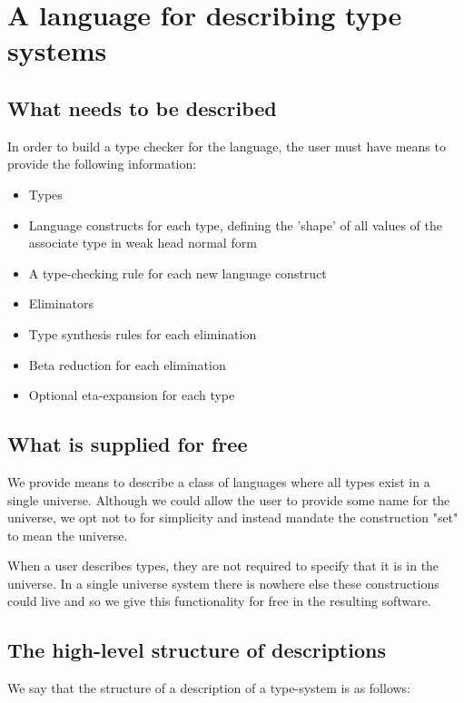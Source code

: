 \chapter{A language for describing type systems}
\label{chapter-DSL}


\section{What needs to be described}

In order to build a type checker for the language, the user must have
means to provide the following information:

\begin{itemize}
  \item Types
  \item Language constructs for each type, defining the 'shape' of
    all values of the associate type in weak head normal form
  \item A type-checking rule for each new language construct
  \item Eliminators
  \item Type synthesis rules for each elimination
  \item Beta reduction for each elimination
  \item Optional eta-expansion for each type
\end{itemize}

\section{What is supplied for free}

We provide means to describe a class of languages where all types
exist in a single universe. Although we could allow the user to
provide some name for the universe, we opt not to for simplicity and
instead mandate the construction "set" to mean the universe.

When a user describes types, they are not required to specify that it
is in the universe. In a single universe system there is nowhere else
these constructions could live and so we give this functionality for
free in the resulting software.

\section{The high-level structure of descriptions}

We say that the structure of a description of a type-system is as
follows: 

